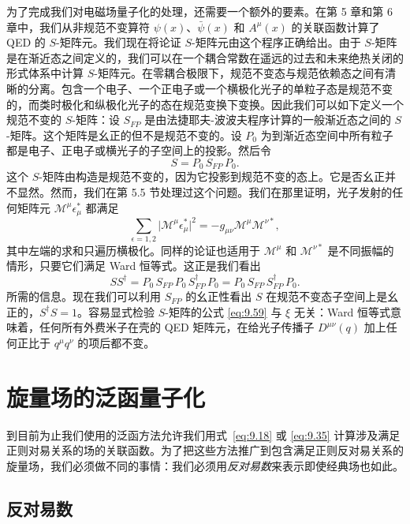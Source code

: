 为了完成我们对电磁场量子化的处理，还需要一个额外的要素。在第 5 章和第 6 章中，我们从非规范不变算符 $\psi(x)$、$\bar{\psi}(x)$ 和 $A^\mu(x)$ 的关联函数计算了 QED 的 $S$-矩阵元。我们现在将论证 $S$-矩阵元由这个程序正确给出。由于 $S$-矩阵是在渐近态之间定义的，我们可以在一个耦合常数在遥远的过去和未来绝热关闭的形式体系中计算 $S$-矩阵元。在零耦合极限下，规范不变态与规范依赖态之间有清晰的分离。包含一个电子、一个正电子或一个横极化光子的单粒子态是规范不变的，而类时极化和纵极化光子的态在规范变换下变换。因此我们可以如下定义一个规范不变的 $S$-矩阵：设 $S_{FP}$ 是由法捷耶夫-波波夫程序计算的一般渐近态之间的 $S$-矩阵。这个矩阵是幺正的但不是规范不变的。设 $P_0$ 为到渐近态空间中所有粒子都是电子、正电子或横光子的子空间上的投影。然后令
\begin{equation}
  S = P_0\,S_{FP}\,P_0 .
  \label{eq:9.59}
\end{equation}
这个 $S$-矩阵由构造是规范不变的，因为它投影到规范不变的态上。它是否幺正并不显然。然而，我们在第 5.5 节处理过这个问题。我们在那里证明，光子发射的任何矩阵元 $\mathcal{M}^\mu\epsilon^{*}_\mu$ 都满足
\begin{equation}
  \sum_{\epsilon=1,2} \bigl| \mathcal{M}^\mu\epsilon^{*}_\mu \bigr|^2
  = -g_{\mu\nu}\mathcal{M}^\mu\mathcal{M}^{\nu*} ,
  \label{eq:9.60}
\end{equation}
其中左端的求和只遍历横极化。同样的论证也适用于 $\mathcal{M}^\mu$ 和 $\mathcal{M}^{\nu*}$ 是不同振幅的情形，只要它们满足 Ward 恒等式。这正是我们看出
\begin{equation}
  SS^{\dagger} = P_0\,S_{FP}\,P_0\,S_{FP}^{\dagger}\,P_0
    = P_0\,S_{FP}\,S_{FP}^{\dagger}\,P_0 .
  \label{eq:9.61}
\end{equation}
所需的信息。现在我们可以利用 $S_{FP}$ 的幺正性看出 $S$ 在规范不变态子空间上是幺正的，$S^{\dagger}S = 1$。容易显式检验 $S$-矩阵的公式 \eqref{eq:9.59} 与 $\xi$ 无关：Ward 恒等式意味着，任何所有外费米子在壳的 QED 矩阵元，在给光子传播子 $D^{\mu\nu}(q)$ 加上任何正比于 $q^\mu q^\nu$ 的项后都不变。

\section{旋量场的泛函量子化}

到目前为止我们使用的泛函方法允许我们用式~\eqref{eq:9.18} 或 \eqref{eq:9.35} 计算涉及满足正则对易关系的场的关联函数。为了把这些方法推广到包含满足正则反对易关系的旋量场，我们必须做不同的事情：我们必须用\emph{反对易数}来表示即使经典场也如此。

\subsection{反对易数}

